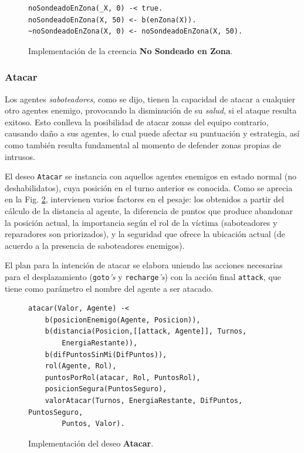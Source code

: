 \documentclass[oneside]{book}
\theoremstyle{definition}
\theoremstyle{example}
\begin{document}
\begin{figure}
\begin{verbatim}
noSondeadoEnZona(_X, 0) -< true.
noSondeadoEnZona(X, 50) <- b(enZona(X)).
~noSondeadoEnZona(X, 0) <- noSondeadoEnZona(X, 50).
\end{verbatim}
\caption{Implementación de la creencia \textbf{No Sondeado 
en Zona}.}
\label{fig:creenciaNoSondeado}
\end{figure}

\subsubsection{Atacar}

Los agentes \textit{saboteadores}, como se dijo, tienen la capacidad de atacar a cualquier otro 
agentes enemigo, provocando la disminución de su \textit{salud}, si el ataque resulta exitoso.
Esto conlleva la posibilidad de atacar zonas del equipo contrario, causando daño a sus agentes, 
lo cual puede afectar su puntuación y estrategia, así como también resulta fundamental 
al momento de defender zonas propias de intrusos.

El deseo \texttt{Atacar} se instancia con aquellos agentes enemigos en estado normal (no deshabilidatos),
cuya posición en el turno anterior es conocida. Como se aprecia en la Fig. \ref{fig:deseoAtacar}, 
intervienen varios factores en el pesaje: los obtenidos a partir del cálculo de la distancia al 
agente, la diferencia de puntos que produce abandonar la posición actual, la importancia según el 
rol de la víctima (saboteadores y reparadores son priorizados), y la seguridad que ofrece la ubicación
actual (de acuerdo a la presencia de saboteadores enemigos). 

El plan para la intención de atacar se elabora uniendo las acciones necesarias para el desplazamiento
(\texttt{goto}\textit{'s} y \texttt{recharge}\textit{'s}) con la acción final \texttt{attack}, que 
tiene como parámetro el nombre del agente a ser atacado.

\begin{figure}
\begin{verbatim}
atacar(Valor, Agente) -<
    b(posicionEnemigo(Agente, Posicion)),
    b(distancia(Posicion,[[attack, Agente]], Turnos, 
    	EnergiaRestante)),
	b(difPuntosSinMi(DifPuntos)),
    rol(Agente, Rol),
	puntosPorRol(atacar, Rol, PuntosRol),
	posicionSegura(PuntosSeguro),
	valorAtacar(Turnos, EnergiaRestante, DifPuntos, PuntosSeguro, 
		Puntos, Valor).
\end{verbatim}
\caption{Implementación del deseo \textbf{Atacar}.}
\label{fig:deseoAtacar}
\end{figure}
\end{document}

